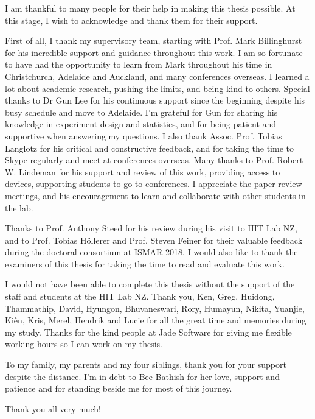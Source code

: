 \begin{acknowledgements}
\addchaptertocentry{\acknowledgementname} %

I am thankful to many people for their help in making this thesis possible. At this stage, I wish to acknowledge and thank them for their support. 

First of all, I thank my supervisory team, starting with Prof. Mark Billinghurst for his incredible support and guidance throughout this work. I am so fortunate to have had the opportunity to learn from Mark throughout his time in Christchurch, Adelaide and Auckland, and many conferences overseas. I learned a lot about academic research, pushing the limits, and being kind to others. 
Special thanks to Dr Gun Lee for his continuous support since the beginning despite his busy schedule and move to Adelaide. I'm grateful for Gun for sharing his knowledge in experiment design and statistics, and for being patient and supportive when answering my questions. 
I also thank Assoc. Prof. Tobias Langlotz for his critical and constructive feedback, and for taking the time to Skype regularly and meet at conferences overseas.
Many thanks to Prof. Robert W. Lindeman for his support and review of this work, providing access to devices, supporting students to go to conferences. I appreciate the paper-review meetings, and his encouragement to learn and collaborate with other students in the lab. 

Thanks to Prof. Anthony Steed for his review during his visit to HIT Lab NZ, and to Prof. Tobias Höllerer and Prof. Steven Feiner for their valuable feedback during the doctoral consortium at ISMAR 2018. I would also like to thank the examiners of this thesis for taking the time to read and evaluate this work. 

I would not have been able to complete this thesis without the support of the staff and students at the HIT Lab NZ. Thank you, Ken, Greg, Huidong, Thammathip, David, Hyungon, Bhuvaneswari, Rory, Humayun, Nikita, Yuanjie, Kiên, Kris, Merel, Hendrik and Lucie for all the great time and memories during my study. Thanks for the kind people at Jade Software for giving me flexible working hours so I can work on my thesis.

To my family, my parents and my four siblings, thank you for your support despite the distance. I'm in debt to Bee Bathish for her love, support and patience and for standing beside me for most of this journey. 

Thank you all very much!

\end{acknowledgements}